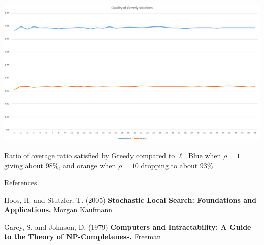 \documentclass[12pt]{beamer}
\begin{document}
\begin{frame}
\begin{center}
	\includegraphics[width=\textwidth]{img/greedy1}
\end{center}

Ratio of average ratio satisfied by Greedy compared to $\ell$. Blue when $\rho=1$ giving about $98\%$, and orange when $\rho=10$ dropping to about $93\%$.
\end{frame}

%
%
%
%

\begin{frame}
{References}
	
	\begin{thebibliography}{References}
		\beamertemplatebookbibitems
		Hoos, H. and Stutzler, T. (2005)
		\textbf{Stochastic Local Search: Foundations and Applications.}
		Morgan Kaufmann

		Garey, S. and Johnson, D. (1979)
		\textbf{Computers and Intractability: A Guide to the Theory of NP-Completeness.}
		Freeman
				
	\end{thebibliography}
	
\end{frame}
\end{document}
